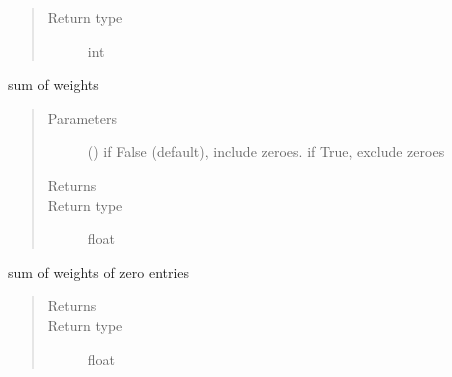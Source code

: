 \documentclass[letterpaper,10pt,english]{sphinxmanual}
\begin{document}
\begin{fulllineitems}
\begin{fulllineitems}
\begin{quote}
\begin{description}
\item[{Return type}] \leavevmode
int

\end{description}\end{quote}

\end{fulllineitems}


\begin{fulllineitems}
\label{\detokenize{Reference:salabim.Monitor.weight}}
sum of weights
\begin{quote}\begin{description}
\item[{Parameters}] \leavevmode
{} () \textendash{} if False (default), include zeroes. if True, exclude zeroes

\item[{Returns}] \leavevmode
{}

\item[{Return type}] \leavevmode
float

\end{description}\end{quote}

\end{fulllineitems}


\begin{fulllineitems}
\label{\detokenize{Reference:salabim.Monitor.weight_zero}}
sum of weights of zero entries
\begin{quote}\begin{description}
\item[{Returns}] \leavevmode
{}

\item[{Return type}] \leavevmode
float

\end{description}\end{quote}

\end{fulllineitems}



\end{fulllineitems}
\end{document}
